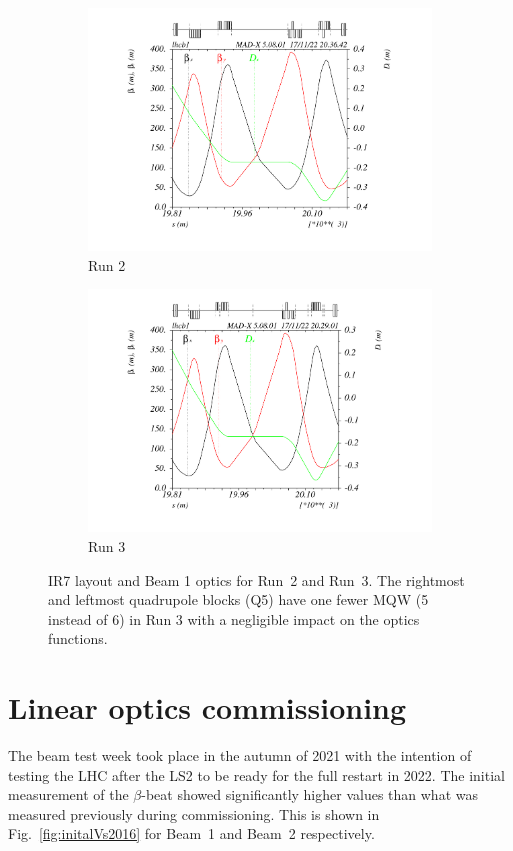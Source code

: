 \documentclass[a4paper]{cernatsnote}
\begin{document}
\begin{figure}
\begin{subfigure}{1.\textwidth}
  \centering
  \includegraphics[width=0.76\linewidth, trim=85 45 70 15, clip]{plots/beam1/IR7_Run2.pdf}  
  \caption{Run 2}
\end{subfigure}
\begin{subfigure}{1.\textwidth}
  \centering
  \includegraphics[width=.83\linewidth, trim=65 45 70 15, clip]{plots/beam1/IR7_Run3.pdf}  
  \caption{Run 3}
\end{subfigure}
\caption{IR7 layout and Beam 1 optics for Run~2 and Run~3. The rightmost and leftmost quadrupole blocks (Q5) have one fewer MQW (5 instead of 6) in Run 3 with a negligible impact on the optics functions.}
\label{fig:IR7}
\end{figure}


\section{Linear optics commissioning}
The beam test week took place in the autumn of 2021 with the intention of testing the LHC after the LS2 to be ready for the full restart in 2022.
The initial measurement of the $\beta$-beat showed significantly higher values than what was measured previously during commissioning. This is shown in Fig.~\ref{fig:initalVs2016} for Beam~1 and Beam~2 respectively.  
\end{document}
